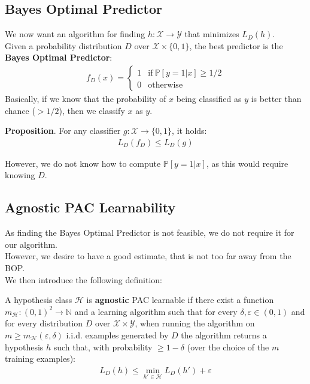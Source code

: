 \documentclass[../template.tex]{subfiles}
\begin{document}
\subsection{Bayes Optimal Predictor}
We now want an algorithm for finding $h\colon \mathcal{X} \to \mathcal{Y} $ that minimizes $L_{D}(h)$.\\

Given a probability distribution $D$ over $\mathcal{X}\times \{0,1\}$, the best predictor is the \textbf{Bayes Optimal Predictor}:
\begin{align*}
    f_{D}(x) = \begin{cases}
        1 & \mathrm{if\ } \mathbb{P}[y=1|x] \geq 1/2\\
        0 & \mathrm{otherwise}  
    \end{cases}
\end{align*}   
Basically, if we know that the probability of $x$ being classified as $y$ is better than chance ($> 1/2$), then we classify $x$ as $y$.    

\textbf{Proposition}. For any classifier $g \colon \mathcal{X} \to \{0,1\}$, it holds:
\begin{align*}
    L_{D}(f_D) \leq L_D(g)
\end{align*}  

However, we do not know how to compute $\mathbb{P}[y=1|x]$, as this would require knowing $D$.

\subsection{Agnostic PAC Learnability}
As finding the Bayes Optimal Predictor is not feasible, we do not require it for our algorithm.\\
However, we desire to have a good estimate, that is not too far away from the BOP.\\
We then introduce the following definition:

\begin{dfn}
    A hypothesis class $\mathcal{H}$ is \textbf{agnostic} PAC learnable if there exist a function $m_{\mathcal{H}}\colon (0,1)^2 \to \mathbb{N}$ and a learning algorithm such that for every $\delta, \varepsilon \in (0,1)$ and for every distribution $D$ over $\mathcal{X} \times \mathcal{Y}$, when running the algorithm on $m \geq m_{\mathcal{H}}(\varepsilon, \delta)$ i.i.d. examples generated by $D$ the algorithm returns a hypothesis $h$ such that, with probability $\geq 1-\delta$ (over the choice of the $m$ training examples):
    \begin{align*}
        L_D(h) \leq \min_{h'\in \mathcal{H}} L_D(h') + \varepsilon
    \end{align*}        
\end{dfn}
\end{document}
